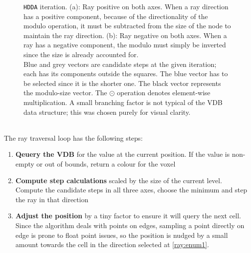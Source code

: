 \begin{figure}[H]
  \centering
  
  \caption{
    \texttt{HDDA} iteration. (a): Ray positive on both axes.
    When a ray direction has a positive component, because of the directionality of the modulo operation, it must be subtracted from the size of the node to maintain the ray direction.
    (b): Ray negative on both axes. When a ray has a negative component, the modulo must simply be inverted since the size is already accounted for. \\
    Blue and grey vectors are candidate steps at the given iteration; each has its components outside the squares.
    The blue vector has to be selected since it is the shorter one.
    The black vector represents the modulo-size vector. The $\odot$ operation denotes element-wise multiplication.
    A small branching factor is not typical of the VDB data structure; this was chosen purely for visual clarity.
  }
  \label{hdda:fig}
\end{figure}

 \\
The ray traversal loop has the following steps:
\begin{enumerate}
  \item \textbf{Qeuery the VDB} for the value at the current position. If the value is non-empty or out of bounds, return a colour for the voxel
  \item\label{ray:enum1} \textbf{Compute step calculations} scaled by the size of the current level.
        Compute the candidate steps in all three axes, choose the minimum and step the ray in that direction
  \item \textbf{Adjust the position} by a tiny factor to ensure it will query the next cell.
        Since the algorithm deals with points on edges, sampling a point directly on edge is prone to float point issues,
        so the position is nudged by a small amount towards the cell in the direction selected at \cref{ray:enum1}.
\end{enumerate}

